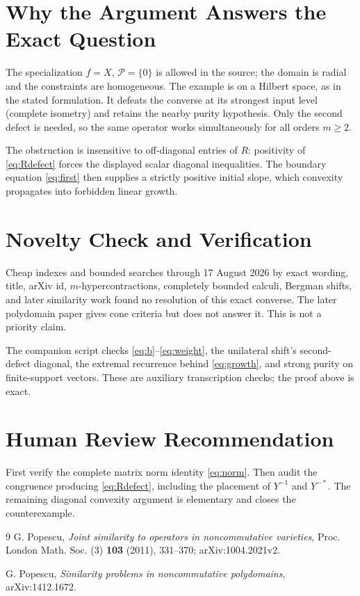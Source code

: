 \documentclass[11pt]{article}
\begin{document}
\section*{Why the Argument Answers the Exact Question}

The specialization $f=X$, $\mathcal P=\{0\}$ is allowed in the source;
the domain is radial and the constraints are homogeneous.  The example is
on a Hilbert space, as in the stated formulation.  It defeats the converse
at its strongest input level (complete isometry) and retains the nearby
purity hypothesis.  Only the second defect is needed, so the same operator
works simultaneously for all orders $m\geq2$.

The obstruction is insensitive to off-diagonal entries of $R$: positivity
of \eqref{eq:Rdefect} forces the displayed scalar diagonal inequalities.
The boundary equation \eqref{eq:first} then supplies a strictly positive
initial slope, which convexity propagates into forbidden linear growth.

\section*{Novelty Check and Verification}

Cheap indexes and bounded searches through 17 August 2026 by exact wording,
title, arXiv id, $m$-hypercontractions, completely bounded calculi, Bergman
shifts, and later similarity work found no resolution of this exact
converse.  The later polydomain paper \cite{P2} gives cone criteria but does
not answer it.  This is not a priority claim.

The companion script checks \eqref{eq:b}--\eqref{eq:weight}, the unilateral
shift's second-defect diagonal, the extremal recurrence behind
\eqref{eq:growth}, and strong purity on finite-support vectors.  These are
auxiliary transcription checks; the proof above is exact.

\section*{Human Review Recommendation}

First verify the complete matrix norm identity \eqref{eq:norm}.  Then audit
the congruence producing \eqref{eq:Rdefect}, including the placement of
$Y^{-1}$ and $Y^{-*}$.  The remaining diagonal convexity argument is
elementary and closes the counterexample.

\begin{thebibliography}{9}
\small
{}
G. Popescu,
\emph{Joint similarity to operators in noncommutative varieties},
Proc. London Math. Soc. (3) \textbf{103} (2011), 331--370;
arXiv:1004.2021v2.

G. Popescu,
\emph{Similarity problems in noncommutative polydomains},
arXiv:1412.1672.
\end{thebibliography}
\end{document}
